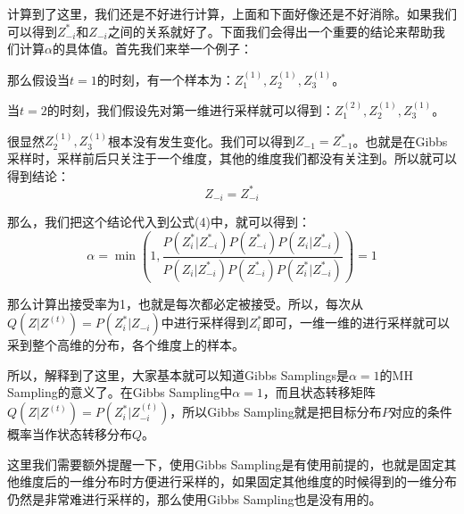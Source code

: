\documentclass[a4paper]{article}
\begin{document}
计算到了这里，我们还是不好进行计算，上面和下面好像还是不好消除。如果我们可以得到$Z_{-i}^\ast$和$Z_{-i}$之间的关系就好了。下面我们会得出一个重要的结论来帮助我们计算$\alpha$的具体值。首先我们来举一个例子：

那么假设当$t=1$的时刻，有一个样本为：$Z_1^{(1)},Z_2^{(1)},Z_3^{(1)}$。

当$t=2$的时刻，我们假设先对第一维进行采样就可以得到：$Z_1^{(2)},Z_2^{(1)},Z_3^{(1)}$。

很显然$Z_2^{(1)},Z_3^{(1)}$根本没有发生变化。我们可以得到$Z_{-1} = Z_{-1}^\ast$。也就是在Gibbs采样时，采样前后只关注于一个维度，其他的维度我们都没有关注到。所以就可以得到结论：
\begin{equation}
    Z_{-i} = Z_{-i}^\ast
\end{equation}

那么，我们把这个结论代入到公式(4)中，就可以得到：
\begin{equation}
    \alpha = \min \left( 1, \frac{P(Z^\ast_{i}|Z^\ast_{-i})P(Z^\ast_{-i})P(Z_i|Z^\ast_{-i})}{P(Z_i|Z_{-i}^\ast)P(Z_{-i}^\ast)P(Z^\ast_i|Z_{-i}^\ast)} \right) = 1
\end{equation}

那么计算出接受率为1，也就是每次都必定被接受。所以，每次从$Q(Z|Z^{(t)}) = P(Z_i^\ast|Z_{-i})$中进行采样得到$Z^\ast_{i}$即可，一维一维的进行采样就可以采到整个高维的分布，各个维度上的样本。

所以，解释到了这里，大家基本就可以知道Gibbs Samplings是$\alpha = 1$的MH Sampling的意义了。在Gibbs Sampling中$\alpha=1$，而且状态转移矩阵$Q(Z|Z^{(t)}) = P(Z^\ast_{i}|Z^{(t)}_{-i})$，所以Gibbs Sampling就是把目标分布$P$对应的条件概率当作状态转移分布$Q$。

这里我们需要额外提醒一下，使用Gibbs Sampling是有使用前提的，也就是固定其他维度后的一维分布时方便进行采样的，如果固定其他维度的时候得到的一维分布仍然是非常难进行采样的，那么使用Gibbs Sampling也是没有用的。
\end{document}
